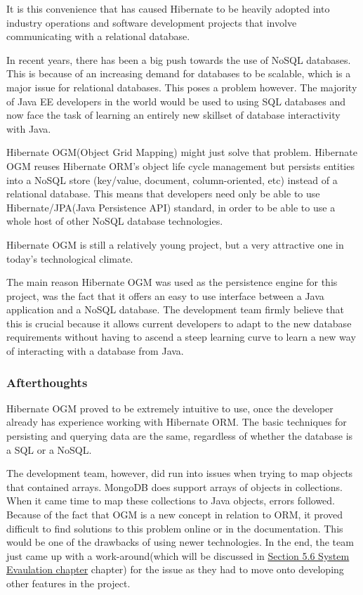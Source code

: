 It is this convenience that has caused Hibernate to be heavily adopted into industry operations and software development projects that involve communicating with a relational database. 

\bigskip

In recent years, there has been a big push towards the use of NoSQL databases. This is because of an increasing demand for databases to be scalable, which is a major issue for relational databases. This poses a problem however. The majority of Java EE developers in the world would be used to using SQL databases and now face the task of learning an entirely new skillset of database interactivity with Java. 

\bigskip

Hibernate OGM(Object Grid Mapping) might just solve that problem\cite{storl2015schemaless}. Hibernate OGM reuses Hibernate ORM’s object life cycle management but persists entities into a NoSQL store (key/value, document, column-oriented, etc) instead of a relational database. This means that developers need only be able to use Hibernate/JPA(Java Persistence API) standard, in order to be able to use a whole host of other NoSQL database technologies. 

\bigskip

Hibernate OGM is still a relatively young project, but a very attractive one in today's technological climate.

The main reason Hibernate OGM was used as the persistence engine for this project, was the fact that it offers an easy to use interface between a Java application and a NoSQL database. The development team firmly believe that this is crucial because it allows current developers to adapt to the new database requirements without having to ascend a steep learning curve to learn a new way of interacting with a database from Java.

\subsubsection{Afterthoughts}

Hibernate OGM proved to be extremely intuitive to use, once the developer already has experience working with Hibernate ORM. The basic techniques for persisting and querying data are the same, regardless of whether the database is a SQL or a NoSQL.

\bigskip

The development team, however, did run into issues when trying to map objects that contained arrays. MongoDB does support arrays of objects in collections. When it came time to map these collections to Java objects, errors followed. Because of the fact that OGM is a new concept in relation to ORM, it proved difficult to find solutions to this problem online or in the documentation. This would be one of the drawbacks of using newer technologies. In the end, the team just came up with a work-around(which will be discussed in \hyperref[sec:SystemEvaluationObjectMapping]{\underline{Section 5.6 System Evaulation chapter}} chapter) for the issue as they had to move onto developing other features in the project. 

